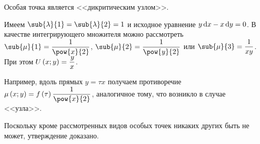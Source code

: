 \documentclass[a5paper,10pt]{article}
\begin{document}
\begin{case}[4]
    Особая точка является <<дикритическим узлом>>.
\end{case}

Имеем $\sub{\lambda}{1} = \sub{\lambda}{2} = 1$ и исходное уравнение $y \di x - x \di y = 0$.
В качестве интегрирующего множителя можно рассмотреть 
$\sub{\mu}{1} = \dfrac {1} {\pow{x}{2}}$, $\sub{\mu}{2} = \dfrac {1} {\pow{y}{2}}$ 
или $\sub{\mu}{3} = \dfrac {1} {xy}$. При этом $U\left(\hspace{0.01em}x; y\hspace{0.01em}\right) = \dfrac {\hspace{0.1em}y} {x}$.

Например, вдоль прямых $y = \tau x$ получаем противоречие
$\mu\br{x; y} = f\br{\tau} \dfrac {1} {\pow{x}{2}}$,
аналогичное тому, что возникло в случае <<узла>>.

Поскольку кроме рассмотренных видов особых точек никаких других быть не может,
утверждение доказано.
\end{document}

